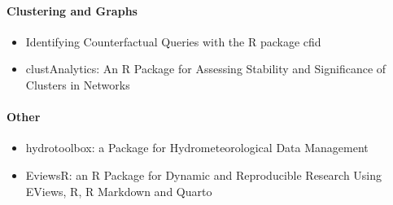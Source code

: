 \hypertarget{clustering-and-graphs}{%
\paragraph{Clustering and Graphs}\label{clustering-and-graphs}}

\begin{itemize}
\tightlist
\item
  Identifying Counterfactual Queries with the R package cfid
\item
  clustAnalytics: An R Package for Assessing Stability and Significance of Clusters in Networks
\end{itemize}

\hypertarget{other}{%
\paragraph{Other}\label{other}}

\begin{itemize}
\tightlist
\item
  hydrotoolbox: a Package for Hydrometeorological Data Management
\item
  EviewsR: an R Package for Dynamic and Reproducible Research Using EViews, R, R Markdown and Quarto
\end{itemize}


\address{%
Simon Urbanek\\
University of Auckland\\%
\\
%
\url{https://journal.r-project.org}\\%
%
\href{mailto:r-journal@r-project.org}{\nolinkurl{r-journal@r-project.org}}%
}
